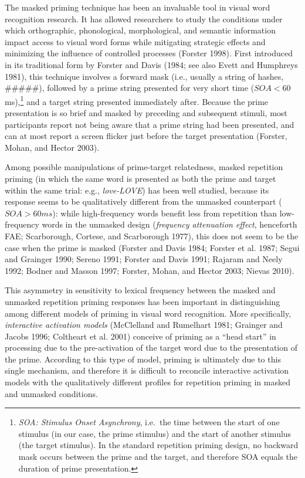 \documentclass[
]{interact}
\begin{document}
The masked priming technique has been an invaluable tool in visual word
recognition research. It has allowed researchers to study the conditions
under which orthographic, phonological, morphological, and semantic
information impact access to visual word forms while mitigating
strategic effects and minimizing the influence of controlled processes
(Forster 1998). First introduced in its traditional form by Forster and
Davis (1984; see also Evett and Humphreys 1981), this technique involves
a forward mask (i.e., usually a string of hashes, \#\#\#\#\#), followed
by a prime string presented for very short time (\(SOA < 60\)
ms),\footnote{\emph{SOA: Stimulus Onset Asynchrony}, i.e.~the time
  between the start of one stimulus (in our case, the prime stimulus)
  and the start of another stimulus (the target stimulus). In the
  standard repetition priming design, no backward mask occurs between
  the prime and the target, and therefore SOA equals the duration of
  prime presentation.} and a target string presented immediately after.
Because the prime presentation is so brief and masked by preceding and
subsequent stimuli, most participants report not being aware that a
prime string had been presented, and can at most report a screen flicker
just before the target presentation (Forster, Mohan, and Hector 2003).

Among possible manipulations of prime-target relatedness, masked
repetition priming (in which the same word is presented as both the
prime and target within the same trial: e.g., \emph{love-LOVE}) has been
well studied, because its response seems to be qualitatively different
from the unmasked counterpart (\(SOA > 60 ms\)): while high-frequency
words benefit less from repetition than low-frequency words in the
unmasked design (\emph{frequency attenuation effect}, henceforth FAE;
Scarborough, Cortese, and Scarborough 1977), this does not seem to be
the case when the prime is masked (Forster and Davis 1984; Forster et
al. 1987; Segui and Grainger 1990; Sereno 1991; Forster and Davis 1991;
Rajaram and Neely 1992; Bodner and Masson 1997; Forster, Mohan, and
Hector 2003; Nievas 2010).

This asymmetry in sensitivity to lexical frequency between the masked
and unmasked repetition priming responses has been important in
distinguishing among different models of priming in visual word
recognition. More specifically, \emph{interactive activation models}
(McClelland and Rumelhart 1981; Grainger and Jacobs 1996; Coltheart et
al. 2001) conceive of priming as a ``head start'' in processing due to
the pre-activation of the target word due to the presentation of the
prime. According to this type of model, priming is ultimately due to
this single mechanism, and therefore it is difficult to reconcile
interactive activation models with the qualitatively different profiles
for repetition priming in masked and unmasked conditions.
\end{document}
